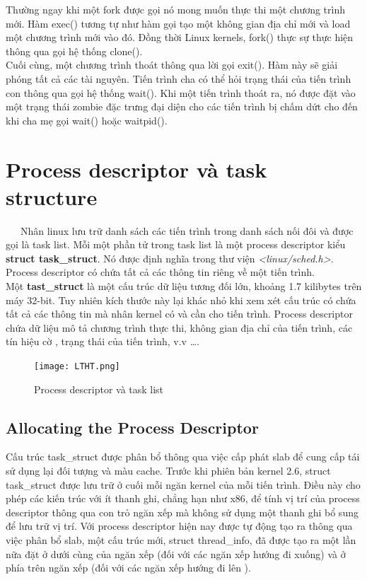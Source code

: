 \documentclass[a4paper,10pt]{report}
\begin{document}
Thường ngay khi một fork được gọi nó mong muốn thực thi một chương trình mới. Hàm exec() tương tự như hàm gọi tạo một không gian địa chỉ mới và load một chương trình mới vào đó. Đồng thời Linux kernels, fork() thực sự thực hiện thông qua gọi hệ thống clone().  \\

Cuối cùng, một chương trình thoát thông qua lời gọi exit(). Hàm này sẽ giải phóng tất cả các tài nguyên. Tiến trình cha có thể hỏi trạng thái của tiến trình con thông qua gọi hệ thống wait(). Khi một tiến trình thoát ra, nó được đặt vào một trạng thái zombie đặc trưng đại diện cho các tiến trình bị chấm dứt cho đến khi cha mẹ gọi wait() hoặc waitpid().
\section{Process descriptor và task structure}
\ \ \ Nhân linux lưu trữ danh sách các tiến trình trong danh sách nối đôi và được gọi là task list. Mỗi một phần tử trong task list là một process descriptor kiểu \textbf{struct task\_struct}. Nó được định nghĩa trong thư viện \textit{<linux/sched.h>}. Process descriptor có chứa tất cả các thông tin riêng về một tiến trình. \\

Một \textbf{tast\_struct} là một cấu trúc dữ liệu tương đối lớn, khoảng 1.7 kilibytes trên máy 32-bit. Tuy nhiên kích thước này lại khác nhỏ khi xem xét cấu trúc có chứa tất cả các thông tin mà nhân kernel có và cần cho tiến trình.  Process descriptor chứa dữ liệu mô tả chương trình thực thi, không gian địa chỉ của tiến trình,  các tín hiệu cờ , trạng thái của tiến trình, v.v \ldots.
\begin{figure}[h]
\begin{center}
\texttt{[image: LTHT.png]}
\caption{Process descriptor và task list}
\end{center}
\end{figure}
\subsection{Allocating the Process Descriptor}
Cấu trúc task\_struct được phân bổ thông qua việc cấp phát slab để cung cấp tái sử dụng lại đối tượng và màu cache. Trước khi phiên bản kernel 2.6, struct task\_struct được lưu trữ ở cuối mỗi ngăn kernel của mỗi tiến trình. Điều này cho phép các kiến trúc với ít thanh ghi, chẳng hạn như x86, để tính vị trí của process descriptor thông qua con trỏ ngăn xếp mà không sử dụng một thanh ghi bổ sung để lưu trữ vị trí. Với process descriptor hiện nay được tự động tạo ra thông qua việc phân bổ slab, một cấu trúc mới, struct thread\_info, đã được tạo ra một lần nữa đặt ở dưới cùng của ngăn xếp (đối với các ngăn xếp hướng đi xuống) và ở phía trên ngăn xếp (đối với các ngăn xếp hướng đi lên ). \\
\end{document}

